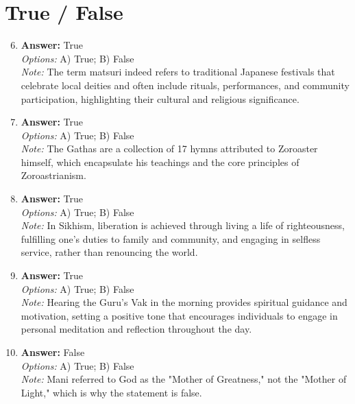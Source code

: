\documentclass[12pt]{article}
\begin{document}
\section*{True / False}
\begin{enumerate}[label=\arabic*.]
\setcounter{enumi}{5}
\item \textbf{Answer:} True
\\ \textit{Options:} A) True; B) False
\\ \textit{Note:} The term matsuri indeed refers to traditional Japanese festivals that celebrate local deities and often include rituals, performances, and community participation, highlighting their cultural and religious significance.
\item \textbf{Answer:} True
\\ \textit{Options:} A) True; B) False
\\ \textit{Note:} The Gathas are a collection of 17 hymns attributed to Zoroaster himself, which encapsulate his teachings and the core principles of Zoroastrianism.
\item \textbf{Answer:} True
\\ \textit{Options:} A) True; B) False
\\ \textit{Note:} In Sikhism, liberation is achieved through living a life of righteousness, fulfilling one's duties to family and community, and engaging in selfless service, rather than renouncing the world.
\item \textbf{Answer:} True
\\ \textit{Options:} A) True; B) False
\\ \textit{Note:} Hearing the Guru's Vak in the morning provides spiritual guidance and motivation, setting a positive tone that encourages individuals to engage in personal meditation and reflection throughout the day.
\item \textbf{Answer:} False
\\ \textit{Options:} A) True; B) False
\\ \textit{Note:} Mani referred to God as the "Mother of Greatness," not the "Mother of Light," which is why the statement is false.
\end{enumerate}
\end{document}
